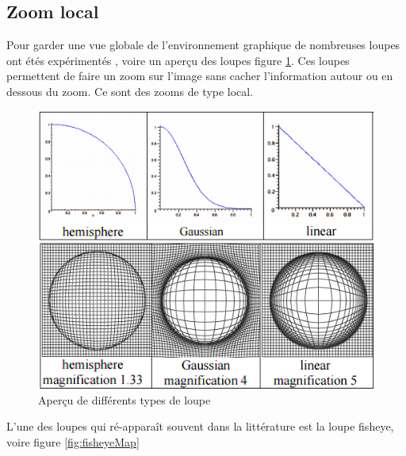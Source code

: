 \subsection{Zoom local}

Pour garder une vue globale de l'environnement graphique de nombreuses loupes ont étés expérimentés \cite{Carpendale:2004:AHM:1029632.1029645}, voire un aperçu des loupes figure \ref{fig:loupeMultiple}. Ces loupes permettent de faire un zoom sur l'image sans cacher l'information autour ou en dessous du zoom. Ce sont des zooms de type local.


\begin{figure}[!ht]
	\center	
	\includegraphics[scale=0.7]{image/LoupeMultiple.png}
	\caption{Aperçu de différents types de loupe}
	\label{fig:loupeMultiple}
\end{figure}

L'une des loupes qui ré-apparaît souvent dans la littérature est la loupe fisheye, voire figure \ref{fig:fisheyeMap}

